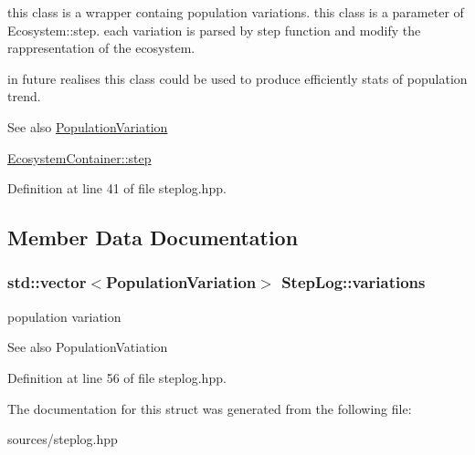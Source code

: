 this class is a wrapper containg population variations. this class is a parameter of Ecosystem::step. each variation is parsed by step function and modify the rappresentation of the ecosystem.

in future realises this class could be used to produce efficiently stats of population trend.

\begin{DoxySeeAlso}{See also}
\hyperlink{structPopulationVariation}{PopulationVariation} 

\hyperlink{classEcosystemContainer_a16d9614266ac07dc5252b1e731ab4712}{EcosystemContainer::step} 
\end{DoxySeeAlso}


Definition at line 41 of file steplog.hpp.



\subsection{Member Data Documentation}
\hypertarget{structStepLog_ad0948f21ac2ed795000229a0d40deea7}{
\subsubsection[{variations}]{\setlength{\rightskip}{0pt plus 5cm}std::vector$<${\bf PopulationVariation}$>$ {\bf StepLog::variations}}}
\label{structStepLog_ad0948f21ac2ed795000229a0d40deea7}


population variation 

\begin{DoxySeeAlso}{See also}
PopulationVatiation 
\end{DoxySeeAlso}


Definition at line 56 of file steplog.hpp.



The documentation for this struct was generated from the following file:\begin{DoxyCompactItemize}
\item 
sources/steplog.hpp\end{DoxyCompactItemize}
